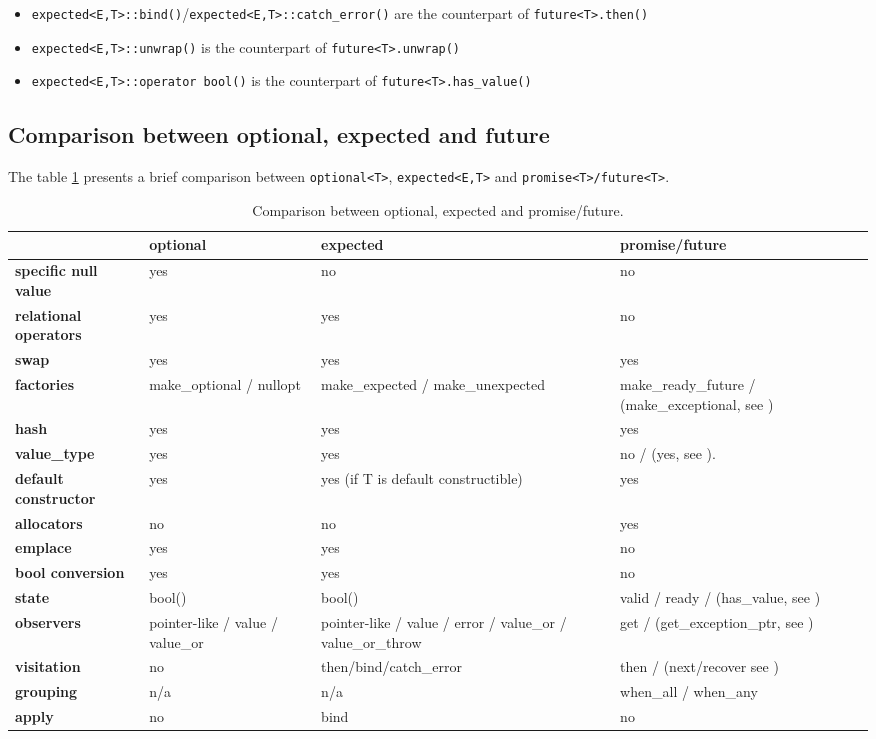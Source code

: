 \documentclass[a4paper,10pt]{article}
\newcommand{\cpp}[1]{\lstinline{#1}}
\begin{document}
\begin{itemize}
 \item \cpp{expected<E,T>::bind()}/\cpp{expected<E,T>::catch_error()} are the counterpart of \cpp{future<T>.then()}
 \item \cpp{expected<E,T>::unwrap()} is the counterpart of \cpp{future<T>.unwrap()}
 \item \cpp{expected<E,T>::operator bool()} is the counterpart of \cpp{future<T>.has_value()}
\end{itemize}

\subsection{Comparison between optional, expected and future}

The table \ref{comp-monads} presents a brief comparison between \cpp{optional<T>}, \cpp{expected<E,T>}  and \cpp{promise<T>/future<T>}.

\begin{table}
\bgroup
\def\arraystretch{1.5}
\begin{tabular}{|l|>{\raggedright\arraybackslash}p{4cm}|>{\raggedright\arraybackslash}p{4cm}|>{\raggedright\arraybackslash}p{4cm}|}
\hline
                    & \textbf{optional} & \textbf{expected} & \textbf{promise/future} \\
\hline
\textbf{specific null value} & yes & no & no \\
\hline
\textbf{relational operators} & yes & yes & no \\
\hline
\textbf{swap} & yes & yes & yes \\
\hline
\textbf{factories} & make_optional / nullopt & make_expected / make_unexpected & make_ready_future / (make_exceptional, see \cite{MoreAsync}) \\
\hline
\textbf{hash} & yes & yes & yes \\
\hline
\textbf{value_type} & yes & yes & no / (yes, see \cite{MoreAsync}).  \\
\hline
\textbf{default constructor} & yes & yes (if T is default constructible) & yes \\
\hline
\textbf{allocators} & no & no & yes \\
\hline
\textbf{emplace} & yes & yes & no \\
\hline
\textbf{bool conversion} & yes & yes & no \\
\hline
\textbf{state} & bool()  &  bool() & valid / ready / (has_value, see \cite{MoreAsync}) \\
\hline
\textbf{observers} & pointer-like / value / value_or & pointer-like / value / error / value_or / value_or_throw & get / (get_exception_ptr, see \cite{MoreAsync}) \\
\hline
\textbf{visitation} & no & then/bind/catch_error  & then / (next/recover see \cite{MoreAsync}) \\
\hline
\textbf{grouping} & n/a & n/a & when_all / when_any \\
\hline
\textbf{apply} & no & bind & no \\
\hline
\end{tabular}
\egroup
\caption{Comparison between optional, expected and promise/future.}
\label{comp-monads}
\end{table}
\end{document}
